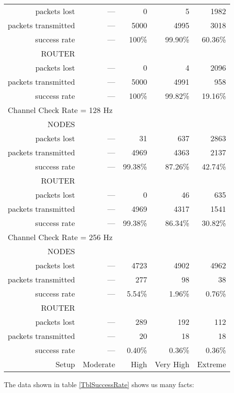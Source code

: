 \documentclass[a4paper,twoside]{article}
\begin{document}
\begin{table*}[htbp]
\begin{tabular}{|r|r|r|r|r|}
packets lost & --- & 0 & 5 & 1982 \\
packets transmitted & --- & 5000 & 4995 & 3018 \\
success rate & --- & 100\% & 99.90\% & 60.36\% \\
ROUTER & & & & \\
packets lost & --- & 0 & 4 & 2096 \\
packets transmitted & --- & 5000 & 4991 & 958 \\
success rate & --- & 100\% & 99.82\% & 19.16\% \\
\hline
\multicolumn{5}{|l|}{Channel Check Rate = 128 Hz}\\
\hline
NODES & & & & \\
packets lost & --- & 31 & 637 & 2863 \\
packets transmitted & --- & 4969 & 4363 & 2137 \\
success rate & --- & 99.38\% & 87.26\% & 42.74\% \\
ROUTER & & & & \\
packets lost & --- & 0 & 46 & 635 \\
packets transmitted & --- & 4969 & 4317 & 1541 \\
success rate & --- & 99.38\% & 86.34\% & 30.82\% \\
\hline
\multicolumn{5}{|l|}{Channel Check Rate = 256 Hz}\\
\hline
NODES & & & & \\
packets lost & --- & 4723 & 4902 & 4962 \\
packets transmitted & --- & 277 & 98 & 38 \\
success rate & --- & 5.54\% & 1.96\% & 0.76\% \\
ROUTER & & & & \\
packets lost & --- & 289 & 192 & 112 \\
packets transmitted & --- & 20 & 18 & 18 \\
success rate & --- & 0.40\% & 0.36\% & 0.36\% \\
\hline
Setup & Moderate & High & Very High & Extreme \\
\hline
\end{tabular}
\caption{Rate of packets arrived to their destination,
         according to the ContikiMAC channel check rate.\\
         Results obtained with fixed packet number simulations.}
\label{TblSuccessRate}
\end{table*}

The data shown in table \ref{TblSuccessRate} shows us many facts:
\end{document}
